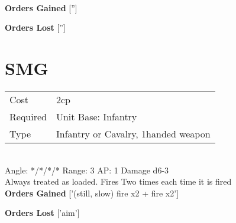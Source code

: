 \ \\

{\bf Orders Gained}
['']

{\bf Orders Lost}
['']
\section{ SMG }

\begin{tabular}{ll}
    Cost & 2cp \\
    Required & Unit Base: Infantry\\
    Type & Infantry or Cavalry, 1handed weapon\\
\end{tabular}
\ \\
\indent Angle: */*/*/* Range: 3  AP: 1 Damage d6-3 \\
Always treated as loaded. Fires Two times each time it is fired
\ \\

{\bf Orders Gained}
['(still, slow) fire x2 + fire x2']

{\bf Orders Lost}
['aim']
